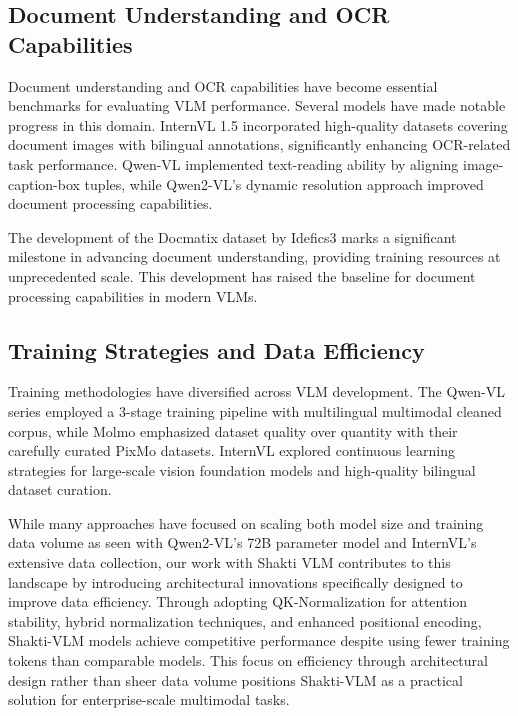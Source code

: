 \documentclass{article}
\begin{document}
\subsection{Document Understanding and OCR Capabilities }
Document understanding and OCR capabilities have become essential benchmarks for evaluating VLM performance. Several models have made notable progress in this domain. InternVL 1.5\cite{chen2024fargpt4vclosinggapInternvl1.5} incorporated high-quality datasets covering document images with bilingual annotations, significantly enhancing OCR-related task performance. Qwen-VL\cite{bai2023qwenvlversatilevisionlanguagemodel} implemented text-reading ability by aligning image-caption-box tuples, while Qwen2-VL's dynamic resolution approach improved document processing capabilities. 

The development of the Docmatix dataset by Idefics3\cite{laurençon2024buildingbetterunderstandingvisionlanguage} marks a significant milestone in advancing document understanding, providing training resources at unprecedented scale. This development has raised the baseline for document processing capabilities in modern VLMs.  

\subsection{Training Strategies and Data Efficiency}
Training methodologies have diversified across VLM development. The Qwen-VL\cite{bai2023qwenvlversatilevisionlanguagemodel} series employed a 3-stage training pipeline with multilingual multimodal cleaned corpus, while Molmo\cite{deitke2024molmopixmoopenweights} emphasized dataset quality over quantity with their carefully curated PixMo datasets. InternVL explored continuous learning strategies for large-scale vision foundation models and high-quality bilingual dataset curation. 

While many approaches have focused on scaling both model size and training data volume as seen with Qwen2-VL's 72B parameter model and InternVL's extensive data collection, our work with Shakti VLM contributes to this landscape by introducing architectural innovations specifically designed to improve data efficiency. Through adopting QK-Normalization\cite{henry2020querykeynormalizationtransformers} for attention stability, hybrid normalization techniques, and enhanced positional encoding, Shakti-VLM models achieve competitive performance despite using fewer training tokens than comparable models. This focus on efficiency through architectural design rather than sheer data volume positions Shakti-VLM as a practical solution for enterprise-scale multimodal tasks. 
\end{document}
